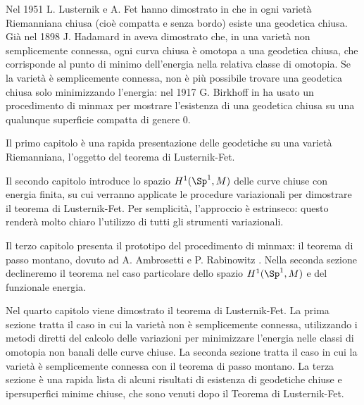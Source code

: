 Nel 1951 L. Lusternik e A. Fet hanno dimostrato in \cite{lusternik1951variational} che in ogni varietà Riemanniana chiusa (cioè compatta e senza bordo) esiste una geodetica chiusa. Già nel 1898 J. Hadamard in \cite{hadamard1898surfaces} aveva dimostrato che, in una varietà non semplicemente connessa, ogni curva chiusa è omotopa a una geodetica chiusa, che corrisponde al punto di minimo dell'energia nella relativa classe di omotopia. Se la varietà è semplicemente connessa, non è più possibile trovare una geodetica chiusa solo minimizzando l'energia: nel 1917 G. Birkhoff in \cite{birkhoff1917dynamical} ha usato un procedimento di minmax per mostrare l'esistenza di una geodetica chiusa su una qualunque superficie compatta di genere 0. 

Il primo capitolo è una rapida presentazione delle geodetiche su una varietà Riemanniana, l'oggetto del teorema di Lusternik-Fet. 

Il secondo capitolo introduce lo spazio \(H^1(\Sp^1,M)\) delle curve chiuse con energia finita, su cui verranno applicate le procedure variazionali per dimostrare il teorema di Lusternik-Fet. Per semplicità, l'approccio è estrinseco: questo renderà molto chiaro l'utilizzo di tutti gli strumenti variazionali.

Il terzo capitolo presenta il prototipo del procedimento di minmax: il teorema di passo montano, dovuto ad A. Ambrosetti e P. Rabinowitz \cite{ambrosetti1973dual}. Nella seconda sezione declineremo il teorema nel caso particolare dello spazio \(H^1(\Sp^1,M)\) e del funzionale energia. 

Nel quarto capitolo viene dimostrato il teorema di Lusternik-Fet. La prima sezione tratta il caso in cui la varietà non è semplicemente connessa, utilizzando i metodi diretti del calcolo delle variazioni per minimizzare l'energia nelle classi di omotopia non banali delle curve chiuse. La seconda sezione tratta il caso in cui la varietà è semplicemente connessa con il teorema di passo montano. La terza sezione è una rapida lista di alcuni risultati di esistenza di geodetiche chiuse e ipersuperfici minime chiuse, che sono venuti dopo il Teorema di Lusternik-Fet.